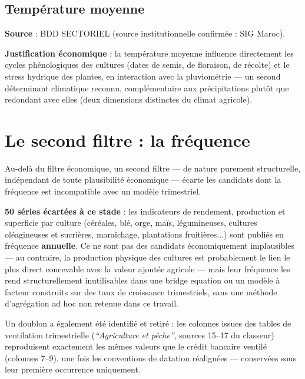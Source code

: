 \documentclass[11pt,a4paper]{article}
\begin{document}
\subsection{Température moyenne}

\textbf{Source} : BDD SECTORIEL (source institutionnelle confirmée : SIG Maroc).

\textbf{Justification économique} : la température moyenne influence directement les cycles phénologiques des cultures (dates de semis, de floraison, de récolte) et le stress hydrique des plantes, en interaction avec la pluviométrie --- un second déterminant climatique reconnu, complémentaire aux précipitations plutôt que redondant avec elles (deux dimensions distinctes du climat agricole).

\section{Le second filtre : la fréquence}
\label{sec:frequence}

Au-delà du filtre économique, un second filtre --- de nature purement structurelle, indépendant de toute plausibilité économique --- écarte les candidats dont la fréquence est incompatible avec un modèle trimestriel.

\begin{fichebox}
\textbf{50 séries écartées à ce stade} : les indicateurs de rendement, production et superficie par culture (céréales, blé, orge, maïs, légumineuses, cultures oléagineuses et sucrières, maraîchage, plantations fruitières...) sont publiés en fréquence \textbf{annuelle}. Ce ne sont pas des candidats économiquement implausibles --- au contraire, la production physique des cultures est probablement le lien le plus direct concevable avec la valeur ajoutée agricole --- mais leur fréquence les rend structurellement inutilisables dans une bridge equation ou un modèle à facteur construits sur des taux de croissance trimestriels, sans une méthode d'agrégation ad hoc non retenue dans ce travail.
\end{fichebox}

Un doublon a également été identifié et retiré : les colonnes issues des tables de ventilation trimestrielle (\textit{``Agriculture et pêche''}, sources 15--17 du classeur) reproduisent exactement les mêmes valeurs que le crédit bancaire ventilé (colonnes 7--9), une fois les conventions de datation réalignées --- conservées sous leur première occurrence uniquement.
\end{document}
